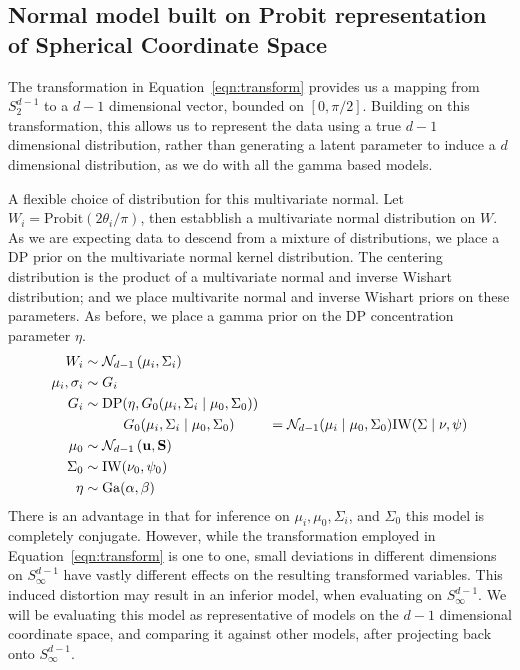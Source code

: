 
\subsection{Normal model built on Probit representation of Spherical Coordinate Space}
\label{method:npprobitnorm}
The transformation in Equation~\ref{eqn:transform} provides us a mapping from $S_{2}^{d-1}$ to a
  $d-1$ dimensional vector, bounded on $[0, \pi/2]$.  Building on this transformation, this allows
  us to represent the data using a true $d-1$ dimensional distribution, rather than generating a
  latent parameter to induce a $d$ dimensional distribution, as we do with all the gamma based
  models.

A flexible choice of distribution for this multivariate normal.  Let
  $W_i = \text{Probit}(2\theta_i /\pi)$, then estabblish a multivariate normal distribution on $W$.
  As we are expecting data to descend from a mixture of distributions, we place a DP prior on the
  multivariate normal kernel distribution.  The centering distribution is the product of a
  multivariate normal and inverse Wishart distribution; and we place multivarite normal and
  inverse Wishart priors on these parameters.  As before, we place a gamma prior on the DP
  concentration parameter $\eta$.
  \begin{equation}
    \begin{aligned}
                W_i &\sim \mathcal{N}_{d-1}\left(\mu_i, \Sigma_i\right)\\
    \mu_i, \sigma_i &\sim G_i\\
                G_i &\sim \text{DP}(\eta, G_0(\mu_i,\Sigma_i\mid\mu_0,\Sigma_0))\\
                    &\hspace{1cm}G_0(\mu_i,\Sigma_i\mid\mu_0,\Sigma_0) &=
                      \mathcal{N}_{d-1}(\mu_i\mid\mu_0,\Sigma_0)\text{IW}(\Sigma\mid\nu,\psi)\\
              \mu_0 &\sim \mathcal{N}_{d-1}\left({\bf u},{\bf S}\right)\\
           \Sigma_0 &\sim \text{IW}(\nu_0,\psi_0)\\
               \eta &\sim \text{Ga}(\alpha, \beta)
    \end{aligned}
  \end{equation}
There is an advantage in that for inference on $\mu_i, \mu_0, \Sigma_i$, and $\Sigma_0$ this model
  is completely conjugate.  However, while the transformation employed in Equation~\ref{eqn:transform}
  is one to one, small deviations in different dimensions on $S_{\infty}^{d-1}$ have vastly different
  effects on the resulting transformed variables.  This induced distortion may result in an inferior
  model, when evaluating on $S_{\infty}^{d-1}$.  We will be evaluating this model as representative
  of models on the $d-1$ dimensional coordinate space, and comparing it against other models, after
  projecting back onto $S_{\infty}^{d-1}$.
